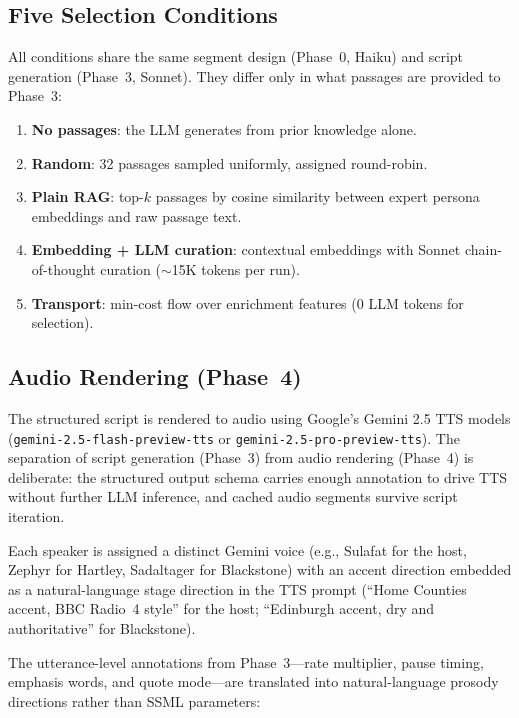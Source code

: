 \documentclass[final]{clv2025}
\begin{document}
\subsection{Five Selection Conditions}
\label{sec:conditions}

All conditions share the same segment design (Phase~0, Haiku) and
script generation (Phase~3, Sonnet).  They differ only in what
passages are provided to Phase~3:

\begin{enumerate}
\item \textbf{No passages}: the LLM generates from prior knowledge
  alone.
\item \textbf{Random}: 32 passages sampled uniformly, assigned
  round-robin.
\item \textbf{Plain RAG}: top-$k$ passages by cosine similarity
  between expert persona embeddings and raw passage text.
\item \textbf{Embedding + LLM curation}: contextual embeddings
  \citep{anthropic2024context} with Sonnet chain-of-thought
  curation ($\sim$15K tokens per run).
\item \textbf{Transport}: min-cost flow over enrichment features
  (0 LLM tokens for selection).
\end{enumerate}


\subsection{Audio Rendering (Phase~4)}
\label{sec:audio}

The structured script is rendered to audio using Google's Gemini 2.5
TTS models (\texttt{gemini-2.5-flash-preview-tts} or
\texttt{gemini-2.5-pro-preview-tts}).  The separation of script
generation (Phase~3) from audio rendering (Phase~4) is deliberate:
the structured output schema carries enough annotation to drive TTS
without further LLM inference, and cached audio segments survive
script iteration.

Each speaker is assigned a distinct Gemini voice (e.g., Sulafat for
the host, Zephyr for Hartley, Sadaltager for Blackstone) with an accent
direction embedded as a natural-language stage direction in the TTS
prompt (``Home Counties accent, BBC Radio~4 style'' for the host;
``Edinburgh accent, dry and authoritative'' for Blackstone).

The utterance-level annotations from Phase~3---rate multiplier, pause
timing, emphasis words, and quote mode---are translated into
natural-language prosody directions rather than SSML parameters:
\end{document}
